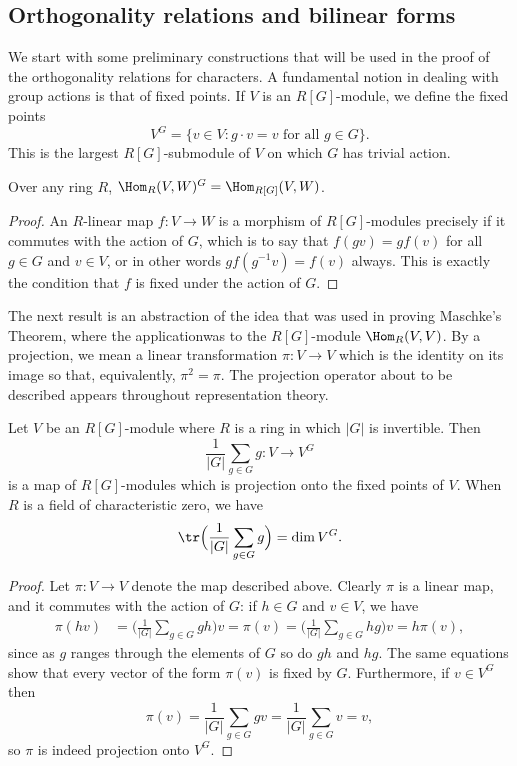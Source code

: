 \subsection{Orthogonality relations and bilinear forms}
We start with some preliminary constructions that will be used in the proof of the orthogonality relations for characters. A fundamental notion in dealing with group actions is that of fixed points. If $V$ is an $R[G]$-module, we define the fixed points
\[V^G=\{v\in V:g\cdot v=v\text{ for all }g\in G\}.\]
This is the largest $R[G]$-submodule of $V$ on which $G$ has trivial action.
\begin{lemma}\label{representation fix point of Hom}
Over any ring $R$, $\Hom_R(V,W)^G=\Hom_{R[G]}(V,W)$.
\end{lemma}
\begin{proof}
An $R$-linear map $f:V\to W$ is a morphism of $R[G]$-modules precisely if it commutes with the action of $G$, which is to say that $f(gv)=gf(v)$ for all $g\in G$ and $v\in V$, or in other words $gf(g^{-1}v)=f(v)$ always. This is exactly the condition that $f$ is fixed under the action of $G$.
\end{proof}
The next result is an abstraction of the idea that was used in proving Maschke's Theorem, where the applicationwas to the $R[G]$-module $\Hom_R(V,V)$. By a projection, we mean a linear transformation $\pi:V\to V$ which is the identity on its image so that, equivalently, $\pi^2=\pi$. The projection operator about to be described appears throughout representation theory.
\begin{lemma}\label{representation fix point projection}
Let $V$ be an $R[G]$-module where $R$ is a ring in which $|G|$ is invertible. Then
\[\frac{1}{|G|}\sum_{g\in G}g:V\to V^G\]
is a map of $R[G]$-modules which is projection onto the fixed points of $V$. When $R$ is a field of characteristic zero, we have
\[\tr\Big(\frac{1}{|G|}\sum_{g\in G}g\Big)=\dim V^G.\]
\end{lemma}
\begin{proof}
Let $\pi:V\to V$ denote the map described above. Clearly $\pi$ is a linear map, and it commutes with the action of $G$: if $h\in G$ and $v\in V$, we have
\begin{align*}
\pi(hv)&=\Big(\frac{1}{|G|}\sum_{g\in G}gh\Big)v=\pi(v)=\Big(\frac{1}{|G|}\sum_{g\in G}hg\Big)v=h\pi(v),
\end{align*}
since as $g$ ranges through the elements of $G$ so do $gh$ and $hg$. The same equations show that every vector of the form $\pi(v)$ is fixed by $G$. Furthermore, if $v\in V^G$ then
\[\pi(v)=\frac{1}{|G|}\sum_{g\in G}gv=\frac{1}{|G|}\sum_{g\in G}v=v,\]
so $\pi$ is indeed projection onto $V^G$.
\end{proof}
